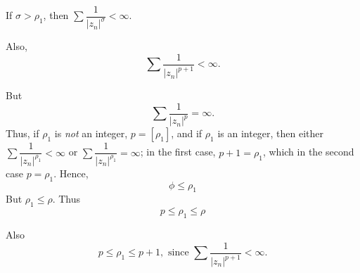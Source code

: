 \begin{remark*}
If $\sigma > \rho_1$, then $\sum \dfrac{1}{|z_n|^\sigma} < \infty$.

Also, 
$$
\sum \frac{1}{|z_n|^{p+1}} < \infty.
$$

But 
$$
\sum \frac{1}{|z_n|^p} = \infty.
$$
Thus, if $\rho_1$ is {\em not} an integer, $p=[\rho_1]$, and if $\rho_1$ is
an integer, then either $\sum \dfrac{1}{|z_n|^{\rho_1}} < \infty$ or
$\sum \dfrac{1}{|z_n|^{\rho_1}} = \infty$; in the first case,
$p+1=\rho_1$, which in the second case $p=\rho_1$. Hence,
$$
\phi \leq \rho_1
$$
But $\rho_1 \leq \rho$. Thus
$$
p \leq \rho_1 \leq \rho
$$

Also
$$
p \leq \rho_1 \leq p +1, \text{ since } \sum \frac{1}{|z_n|^{p+1}} <
\infty.  
$$
\end{remark*}

